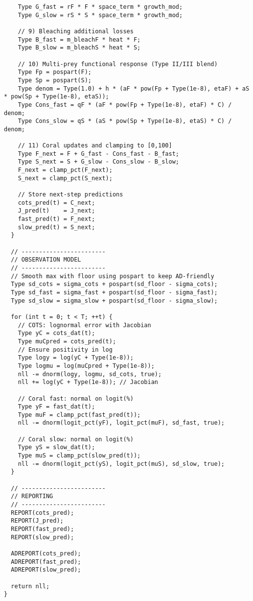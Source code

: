 \begin{lstlisting}
    Type G_fast = rF * F * space_term * growth_mod;
    Type G_slow = rS * S * space_term * growth_mod;

    // 9) Bleaching additional losses
    Type B_fast = m_bleachF * heat * F;
    Type B_slow = m_bleachS * heat * S;

    // 10) Multi-prey functional response (Type II/III blend)
    Type Fp = pospart(F);
    Type Sp = pospart(S);
    Type denom = Type(1.0) + h * (aF * pow(Fp + Type(1e-8), etaF) + aS * pow(Sp + Type(1e-8), etaS));
    Type Cons_fast = qF * (aF * pow(Fp + Type(1e-8), etaF) * C) / denom;
    Type Cons_slow = qS * (aS * pow(Sp + Type(1e-8), etaS) * C) / denom;

    // 11) Coral updates and clamping to [0,100]
    Type F_next = F + G_fast - Cons_fast - B_fast;
    Type S_next = S + G_slow - Cons_slow - B_slow;
    F_next = clamp_pct(F_next);
    S_next = clamp_pct(S_next);

    // Store next-step predictions
    cots_pred(t) = C_next;
    J_pred(t)    = J_next;
    fast_pred(t) = F_next;
    slow_pred(t) = S_next;
  }

  // ------------------------
  // OBSERVATION MODEL
  // ------------------------
  // Smooth max with floor using pospart to keep AD-friendly
  Type sd_cots = sigma_cots + pospart(sd_floor - sigma_cots);
  Type sd_fast = sigma_fast + pospart(sd_floor - sigma_fast);
  Type sd_slow = sigma_slow + pospart(sd_floor - sigma_slow);

  for (int t = 0; t < T; ++t) {
    // COTS: lognormal error with Jacobian
    Type yC = cots_dat(t);
    Type muCpred = cots_pred(t);
    // Ensure positivity in log
    Type logy = log(yC + Type(1e-8));
    Type logmu = log(muCpred + Type(1e-8));
    nll -= dnorm(logy, logmu, sd_cots, true);
    nll += log(yC + Type(1e-8)); // Jacobian

    // Coral fast: normal on logit(%)
    Type yF = fast_dat(t);
    Type muF = clamp_pct(fast_pred(t));
    nll -= dnorm(logit_pct(yF), logit_pct(muF), sd_fast, true);

    // Coral slow: normal on logit(%)
    Type yS = slow_dat(t);
    Type muS = clamp_pct(slow_pred(t));
    nll -= dnorm(logit_pct(yS), logit_pct(muS), sd_slow, true);
  }

  // ------------------------
  // REPORTING
  // ------------------------
  REPORT(cots_pred);
  REPORT(J_pred);
  REPORT(fast_pred);
  REPORT(slow_pred);

  ADREPORT(cots_pred);
  ADREPORT(fast_pred);
  ADREPORT(slow_pred);

  return nll;
}
\end{lstlisting}

